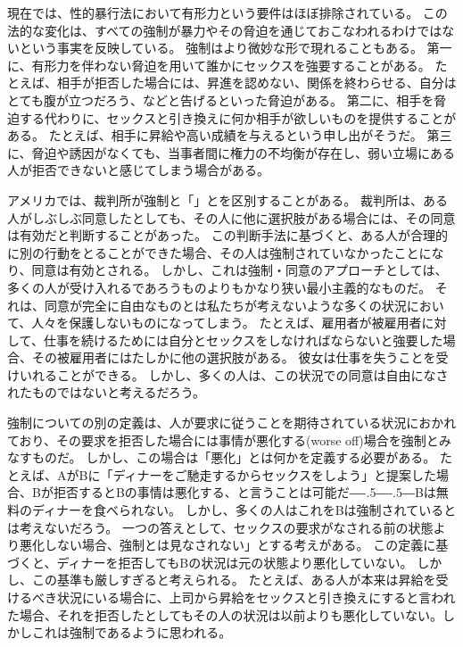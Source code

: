 \documentclass[paper=a4,book,openany]{jlreq}
\def\DDASH{―\kern-.5\zw―\kern-.5\zw―} %
\begin{document}
現在では、性的暴行法において有形力という要件はほぼ排除されている。
この法的な変化は、すべての強制が暴力やその脅迫を通じておこなわれるわけではないという事実を反映している。
強制はより微妙な形で現れることもある。
第一に、有形力を伴わない脅迫を用いて誰かにセックスを強要することがある。
たとえば、相手が拒否した場合には、昇進を認めない、関係を終わらせる、自分はとても腹が立つだろう、などと告げるといった脅迫がある。
第二に、相手を脅迫する代わりに、セックスと引き換えに何か相手が欲しいものを提供することがある。
たとえば、相手に昇給や高い成績を与えるという申し出がそうだ。
第三に、脅迫や誘因がなくても、当事者間に権力の不均衡が存在し、弱い立場にある人が拒否できないと感じてしまう場合がある。

アメリカでは、裁判所が強制と「」とを区別することがある。
裁判所は、ある人がしぶしぶ同意したとしても、その人に他に選択肢がある場合には、その同意は有効だと判断することがあった\citep[p.130]{buchhandler-raphael11:_failur_consen}。
この判断手法に基づくと、ある人が合理的に別の行動をとることができた場合、その人は強制されていなかったことになり、同意は有効とされる。
しかし、これは強制・同意のアプローチとしては、多くの人が受け入れるであろうものよりもかなり狭い最小主義的なものだ。
それは、同意が完全に自由なものとは私たちが考えないような多くの状況において、人々を保護しないものになってしまう。
たとえば、雇用者が被雇用者に対して、仕事を続けるためには自分とセックスをしなければならないと強要した場合、その被雇用者にはたしかに他の選択肢がある。
彼女は仕事を失うことを受けいれることができる。
しかし、多くの人は、この状況での同意は自由になされたものではないと考えるだろう。

強制についての別の定義は、人が要求に従うことを期待されている状況におかれており、その要求を拒否した場合には事情が悪化する(worse off)場合を強制とみなすものだ。
しかし、この場合は「悪化」とは何かを定義する必要がある。
たとえば、AがBに「ディナーをご馳走するからセックスをしよう」と提案した場合、Bが拒否するとBの事情は悪化する、と言うことは可能だ{\DDASH}Bは無料のディナーを食べられない。
しかし、多くの人はこれをBは強制されているとは考えないだろう。
一つの答えとして、セックスの要求がなされる前の状態より悪化しない場合、強制とは見なされない」とする考えがある。
この定義に基づくと、ディナーを拒否してもBの状況は元の状態より悪化していない。
しかし、この基準も厳しすぎると考えられる。
たとえば、ある人が本来は昇給を受けるべき状況にいる場合に、上司から昇給をセックスと引き換えにすると言われた場合、それを拒否したとしてもその人の状況は以前よりも悪化していない。しかしこれは強制であるように思われる。
\end{document}
